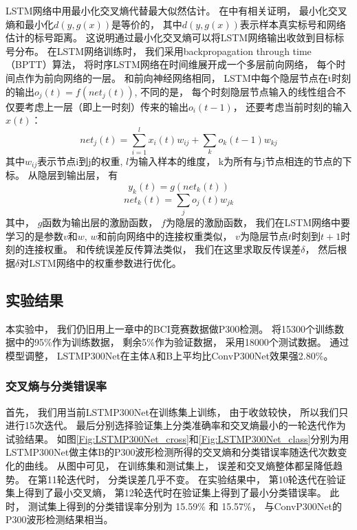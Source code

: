LSTM网络中用最小化交叉熵代替最大似然估计。 在\cite{erdogmus2002error}中有相关证明， 最小化交叉熵和最小化$d(y, g(x))$是等价的， 其中$d(y, g(x))$表示样本真实标号和网络估计的标号距离。 这说明通过最小化交叉熵可以将LSTM网络输出收敛到目标标号分布。 在LSTM网络训练时， 我们采用backpropagation through time（BPTT）算法\cite{williams1990efficient}， 将时序LSTM网络在时间维展开成一个多层前向网络， 每个时间点作为前向网络的一层。
和前向神经网络相同， LSTM中每个隐层节点在t时刻的输出$o_j(t)=f(net_j(t))$, 不同的是， 每个时刻隐层节点输入的线性组合不仅要考虑上一层（即上一时刻）传来的输出$o_i(t-1)$， 还要考虑当前时刻的输入$x(t)$：
\begin{equation}
	net_j(t)=\sum_{i=1}^{l}x_i(t)w_{ij} + \sum_k{o_k(t-1)w_{kj}}
\end{equation}
其中$w_{ij}$表示节点i到j的权重, $l$为输入样本的维度， k为所有与j节点相连的节点的下标。 从隐层到输出层， 有
\begin{equation}
	y_k(t) = g(net_k(t))
\end{equation}
\begin{equation}
	net_k(t) = \sum_j o_j(t)w_{jk}
\end{equation}
其中， $g$函数为输出层的激励函数， $f$为隐层的激励函数， 我们在LSTM网络中要学习的是参数$v$和$w$, $w$和前向网络中的连接权重类似， $v$为隐层节点$t$时刻到$t+1$时刻的连接权重。 和传统误差反传算法类似， 我们在这里求取反传误差$\delta$， 然后根据$\delta$对LSTM网络中的权重参数进行优化。


\subsection{实验结果}

本实验中， 我们仍旧用上一章中的BCI竞赛数据做P300检测。 将15300个训练数据中的95\%作为训练数据， 剩余5\%作为验证数据， 采用18000个测试数据。 通过模型调整， LSTMP300Net在主体A和B上平均比ConvP300Net效果强2.80\%。


\subsubsection{交叉熵与分类错误率}

首先， 我们用当前LSTMP300Net在训练集上训练， 由于收敛较快， 所以我们只进行15次迭代。 最后分别选择验证集上分类准确率和交叉熵最小的一轮迭代作为试验结果。 如图\ref{Fig:LSTMP300Net_cross}和\ref{Fig:LSTMP300Net_class}分别为用LSTMP300Net做主体B的P300波形检测所得的交叉熵和分类错误率随迭代次数变化的曲线。 从图中可见， 在训练集和测试集上， 误差和交叉熵整体都呈降低趋势。 在第11轮迭代时， 分类误差几乎不变。 在实验结果中， 第10轮迭代在验证集上得到了最小交叉熵， 第12轮迭代时在验证集上得到了最小分类错误率。 此时， 测试集上得到的分类错误率分别为 15.59\% 和 15.57\%， 与ConvP300Net的P300波形检测结果相当。


